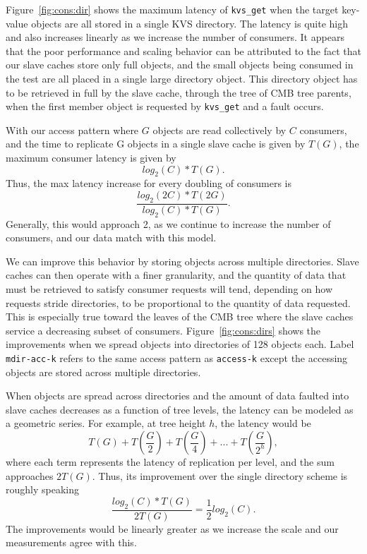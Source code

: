 Figure~\ref{fig:cons:dir} shows the maximum latency of {\tt kvs\_get}
when the target key-value objects are all stored in a single
KVS directory. The latency is quite high and also increases
linearly as we increase the number of consumers. 
It appears that the poor performance and scaling behavior 
can be attributed to the fact that our slave caches store only full
objects, and the small objects being consumed in the test are all
placed in a single large directory object.
This directory object has to be retrieved in full by the slave cache,
through the tree of CMB tree parents, when the first
member object is requested by {\tt kvs\_get} and a fault occurs.

With our access pattern where $G$ objects are read collectively by
$C$ consumers, and the time to replicate G objects in a single slave cache
is given by $T(G)$, the maximum consumer latency is given by
\begin{equation}
log_2(C) * T(G).
\end{equation}
Thus, the max latency increase for every doubling of consumers is
\begin{equation}
\frac{log_2(2C) * T(2G)}{log_2(C) * T(G)}.
\end{equation}
Generally, this would approach 2, 
as we continue to increase the number of consumers,
and our data match with this model.

We can improve this behavior by storing objects across multiple
directories. Slave caches can then operate with a finer granularity,
and the quantity of data that must be retrieved to satisfy consumer
requests will tend, depending on how requests stride directories,
to be proportional to the quantity of data requested.
This is especially true toward the leaves of the CMB tree where the
slave caches service a decreasing subset of consumers.
Figure~\ref{fig:cons:dirs} shows the improvements 
when we spread objects into directories of 128 objects each.
Label {\tt mdir-acc-k} refers to the same access pattern as {\tt access-k} 
except the accessing objects are stored across multiple directories.


When objects are spread across directories and the amount of data
faulted into slave caches decreases as a function of tree levels, 
the latency can be modeled as a geometric series.
For example, at tree height $h$, the latency would be 
\begin{equation}
T(G) + T(\frac{G}{2}) + T(\frac{G}{4}) + ... + T(\frac{G}{2^h}), 
\end{equation}
where each term represents the latency of replication per level,
and the sum approaches $2T(G)$. Thus, its improvement over the single
directory scheme is roughly speaking
\begin{equation}
\frac{log_2(C) * T(G)}{2 T(G)} = \frac{1}{2}log_2(C).
\end{equation}
The improvements would be linearly 
greater as we increase the scale and our measurements agree with this. 

